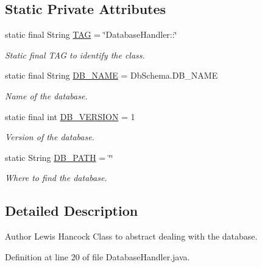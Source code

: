 \subsection*{Static Private Attributes}
\begin{DoxyCompactItemize}
\item 
static final String \hyperlink{classuk_1_1ac_1_1swan_1_1digitaltrails_1_1database_1_1_database_handler_a2d7948efbfb8eaff5813d02948a2b704}{T\+A\+G} = \char`\"{}Database\+Handler\+::\char`\"{}
\begin{DoxyCompactList}\small\item\em Static final T\+A\+G to identify the class. \end{DoxyCompactList}\item 
static final String \hyperlink{classuk_1_1ac_1_1swan_1_1digitaltrails_1_1database_1_1_database_handler_a36c584efca63c019319078fee702109f}{D\+B\+\_\+\+N\+A\+M\+E} = Db\+Schema.\+D\+B\+\_\+\+N\+A\+M\+E
\begin{DoxyCompactList}\small\item\em Name of the database. \end{DoxyCompactList}\item 
static final int \hyperlink{classuk_1_1ac_1_1swan_1_1digitaltrails_1_1database_1_1_database_handler_a942cd71cca4f5fbf5c191d0236115e44}{D\+B\+\_\+\+V\+E\+R\+S\+I\+O\+N} = 1
\begin{DoxyCompactList}\small\item\em Version of the database. \end{DoxyCompactList}\item 
static String \hyperlink{classuk_1_1ac_1_1swan_1_1digitaltrails_1_1database_1_1_database_handler_a390fe5ad11588a477fcd0bff7322a1b6}{D\+B\+\_\+\+P\+A\+T\+H} = \char`\"{}\char`\"{}
\begin{DoxyCompactList}\small\item\em Where to find the database. \end{DoxyCompactList}\end{DoxyCompactItemize}


\subsection{Detailed Description}
\begin{DoxyAuthor}{Author}
Lewis Hancock Class to abstract dealing with the database. 
\end{DoxyAuthor}


Definition at line 20 of file Database\+Handler.\+java.



